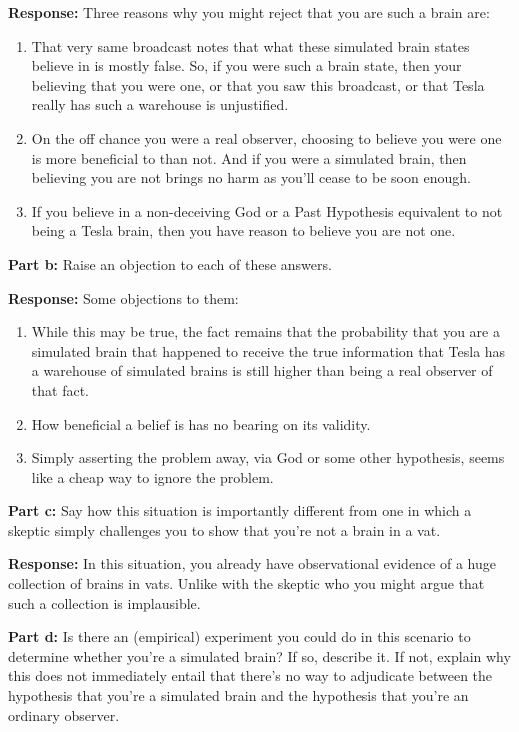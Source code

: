 \documentclass{article}
\begin{document}
\noindent\textbf{Response:} Three reasons why you might reject that you are such a brain are:
\begin{enumerate}
    \item That very same broadcast notes that what these simulated brain states believe in is mostly false. So, if you were such a brain state, then your believing that you were one, or that you saw this broadcast, or that Tesla really has such a warehouse is unjustified.
    \item On the off chance you were a real observer, choosing to believe you were one is more beneficial to than not. And if you were a simulated brain, then believing you are not brings no harm as you'll cease to be soon enough.
    \item If you believe in a non-deceiving God or a Past Hypothesis equivalent to not being a Tesla brain, then you have reason to believe you are not one.
\end{enumerate}
\bigskip

\noindent\textbf{Part b:} Raise an objection to each of these answers.
\bigskip

\noindent\textbf{Response:} Some objections to them:
\begin{enumerate}
    \item While this may be true, the fact remains that the probability that you are a simulated brain that happened to receive the true information that Tesla has a warehouse of simulated brains is still higher than being a real observer of that fact.
    \item How beneficial a belief is has no bearing on its validity.
    \item Simply asserting the problem away, via God or some other hypothesis, seems like a cheap way to ignore the problem.
\end{enumerate}
\bigskip

\noindent\textbf{Part c:} Say how this situation is importantly different from one in which a skeptic simply challenges you to show that you’re not a brain in a vat.
\bigskip

\noindent\textbf{Response:} In this situation, you already have observational evidence of a huge collection of brains in vats. Unlike with the skeptic who you might argue that such a collection is implausible.
\bigskip

\noindent\textbf{Part d:} Is there an (empirical) experiment you could do in this scenario to determine whether you’re a simulated brain? If so, describe it. If not, explain why this does not immediately entail that there’s no way to adjudicate between the hypothesis that you’re a simulated brain and the hypothesis that you’re an ordinary observer.
\bigskip
\end{document}
